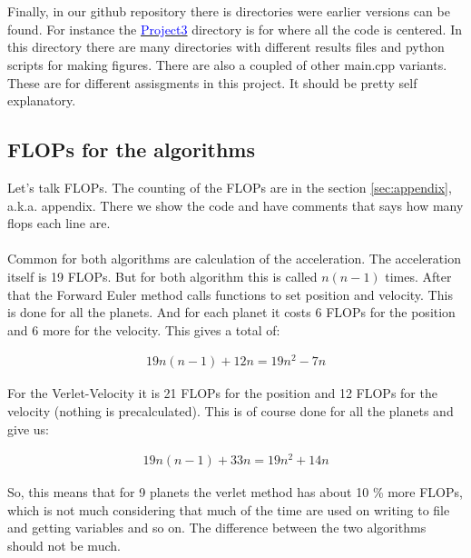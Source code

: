 \\
\\
Finally, in our github repository there is directories were earlier versions can be found. For instance the 
\href{https://github.com/erikfsk/Project-3/tree/master/Project3/}{\textcolor{blue}{Project3}} directory is for where all the code is centered. In this directory there are many directories with different results files and python scripts for making figures. There are also a coupled of other main.cpp variants. These are for different assisgments in this project. It should be pretty self explanatory. 


\pagebreak
\subsection{FLOPs for the algorithms}\label{sec:flops}

Let's talk FLOPs. The counting of the FLOPs are in the section \ref{sec:appendix}, a.k.a. appendix. There we show the code and have comments that says how many flops each line are.
\\
\\
Common for both algorithms are calculation of the acceleration. The acceleration itself is 19 FLOPs. But for both algorithm this is called $n(n-1)$ times. After that the Forward Euler method calls functions to set position and velocity. This is done for all the planets. And for each planet it costs 6 FLOPs for the position and 6 more for the velocity. This gives a total of:

\begin{align*}
	19n(n-1) + 12n = 19n^2 - 7n
\end{align*}

For the Verlet-Velocity it is 21 FLOPs for the position and 12 FLOPs for the velocity (nothing is precalculated). This is of course done for all the planets and give us: 

\begin{align*}
	19n(n-1) + 33n = 19n^2 + 14n
\end{align*}

So, this means that for 9 planets the verlet method has about 10 \% more FLOPs, which is not much considering that much of the time are used on writing to file and getting variables and so on. The difference between the two algorithms should not be much.


























